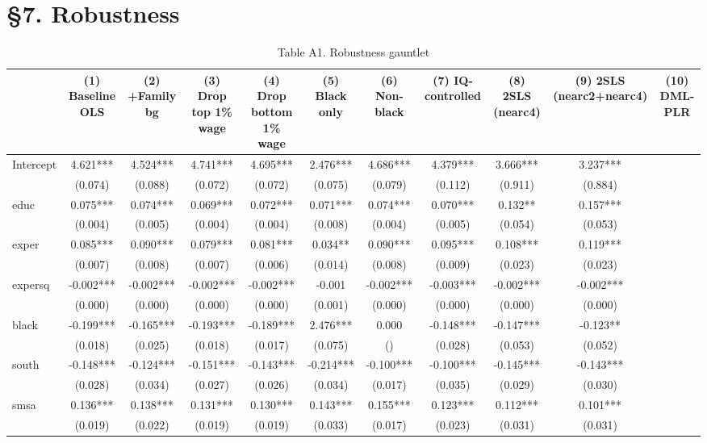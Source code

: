 \section{§7. Robustness}

\begin{table}[htbp]
\centering
\caption{Table A1. Robustness gauntlet}
\begin{tabular}{lcccccccccc}
\hline\hline
 & (1) Baseline OLS & (2) +Family bg & (3) Drop top 1\% wage & (4) Drop bottom 1\% wage & (5) Black only & (6) Non-black & (7) IQ-controlled & (8) 2SLS (nearc4) & (9) 2SLS (nearc2+nearc4) & (10) DML-PLR \\
\hline
Intercept & 4.621*** & 4.524*** & 4.741*** & 4.695*** & 2.476*** & 4.686*** & 4.379*** & 3.666*** & 3.237*** &  \\
 & (0.074) & (0.088) & (0.072) & (0.072) & (0.075) & (0.079) & (0.112) & (0.911) & (0.884) &  \\
educ & 0.075*** & 0.074*** & 0.069*** & 0.072*** & 0.071*** & 0.074*** & 0.070*** & 0.132** & 0.157*** &  \\
 & (0.004) & (0.005) & (0.004) & (0.004) & (0.008) & (0.004) & (0.005) & (0.054) & (0.053) &  \\
exper & 0.085*** & 0.090*** & 0.079*** & 0.081*** & 0.034** & 0.090*** & 0.095*** & 0.108*** & 0.119*** &  \\
 & (0.007) & (0.008) & (0.007) & (0.006) & (0.014) & (0.008) & (0.009) & (0.023) & (0.023) &  \\
expersq & -0.002*** & -0.002*** & -0.002*** & -0.002*** & -0.001 & -0.002*** & -0.003*** & -0.002*** & -0.002*** &  \\
 & (0.000) & (0.000) & (0.000) & (0.000) & (0.001) & (0.000) & (0.000) & (0.000) & (0.000) &  \\
black & -0.199*** & -0.165*** & -0.193*** & -0.189*** & 2.476*** & 0.000 & -0.148*** & -0.147*** & -0.123** &  \\
 & (0.018) & (0.025) & (0.018) & (0.017) & (0.075) & () & (0.028) & (0.053) & (0.052) &  \\
south & -0.148*** & -0.124*** & -0.151*** & -0.143*** & -0.214*** & -0.100*** & -0.100*** & -0.145*** & -0.143*** &  \\
 & (0.028) & (0.034) & (0.027) & (0.026) & (0.034) & (0.017) & (0.035) & (0.029) & (0.030) &  \\
smsa & 0.136*** & 0.138*** & 0.131*** & 0.130*** & 0.143*** & 0.155*** & 0.123*** & 0.112*** & 0.101*** &  \\
 & (0.019) & (0.022) & (0.019) & (0.019) & (0.033) & (0.017) & (0.023) & (0.031) & (0.031) &  \\

\end{tabular}
\end{table}
